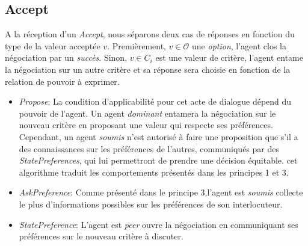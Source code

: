 			 
	
		\subsection{Accept }
			A la réception	d'un \emph{Accept}, nous séparons deux cas de réponses en fonction du type de la valeur acceptée $v$.
			Premièrement, $ v \in \mathcal{O}$ une \textit{option}, l'agent clos la négociation par un \emph{succès}.
			Sinon, $v \in C_i$ est une valeur de critère, l'agent entame la négociation sur un autre critère et sa réponse sera choisie en fonction de la relation de pouvoir à exprimer.
			
			\begin{itemize}
				\item \emph{Propose}: La condition d'applicabilité pour cet acte de dialogue dépend du pouvoir de l'agent. Un agent \emph{dominant} entamera la négociation sur le nouveau critère en proposant une valeur qui respecte ses préférences. Cependant, un agent \emph{soumis} n'est autorisé à faire une proposition que s'il a des connaissances sur les préférences de l'autres,  communiqués par des \emph{StatePreferences}, qui lui permettront de prendre une décision équitable. cet algorithme traduit les comportements présentés dans les principes 1 et 3. 
				
				\item \emph{AskPreference}: Comme présenté dans le principe 3,l'agent est \emph{soumis} collecte le plus d'informations possibles sur les préférences de son interlocuteur. 
				\item \emph{StatePreference}: L'agent est \emph{peer} ouvre la négociation en communiquant ses préférences sur le nouveau critère à discuter. 
				
			\end{itemize}
			
%						
%				
				
